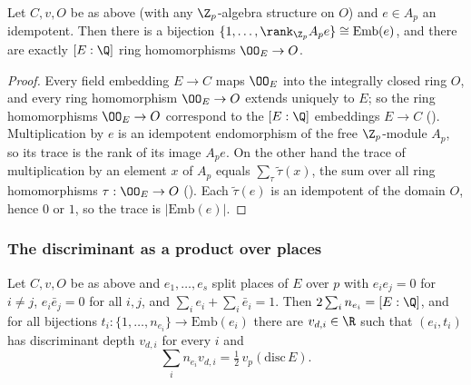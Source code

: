 \begin{lemma}\label{pf:sh-local:countemb}
Let $C,v,O$ be as above (with any $\Z_p$-algebra structure on $O$) and $e\in A_p$ an idempotent. Then there is a
bijection $\{1,\dots,\rank_{\Z_p}A_pe\}\cong\mathrm{Emb}(e)$, and there are exactly $[E:\Q]$ ring homomorphisms
$\OO_E\to O$.
\end{lemma}

\begin{proof}
Every field embedding $E\to C$ maps $\OO_E$ into the integrally closed ring $O$, and every ring homomorphism
$\OO_E\to O$ extends uniquely to $E$; so the ring homomorphisms $\OO_E\to O$ correspond to the $[E:\Q]$ embeddings
$E\to C$ (). Multiplication by $e$ is an idempotent endomorphism of the free
$\Z_p$-module $A_p$, so its trace is the rank of its image $A_pe$. On the other hand the trace of multiplication by
an element $x$ of $A_p$ equals $\sum_\tau\tilde\tau(x)$, the sum over all ring homomorphisms $\tau:\OO_E\to O$
(). Each $\tilde\tau(e)$ is an idempotent of the domain $O$, hence $0$ or $1$, so the
trace is $|\mathrm{Emb}(e)|$.
\end{proof}

\subsubsection{The discriminant as a product over places}

\begin{proposition}\label{pf:sh-local:discprod}
Let $C,v,O$ be as above and $e_1,\dots,e_s$ split places of $E$ over $p$ with $e_ie_j=0$ for $i\ne j$,
$e_i\bar e_j=0$ for all $i,j$, and $\sum_ie_i+\sum_i\bar e_i=1$. Then $2\sum_in_{e_i}=[E:\Q]$, and for all bijections
$t_i:\{1,\dots,n_{e_i}\}\to\mathrm{Emb}(e_i)$ there are $v_{d,i}\in\R$ such that $(e_i,t_i)$ has discriminant depth
$v_{d,i}$ for every $i$ and
\[
\sum_in_{e_i}v_{d,i}=\tfrac12\,v_p(\mathrm{disc}\,E).
\]
\end{proposition}

